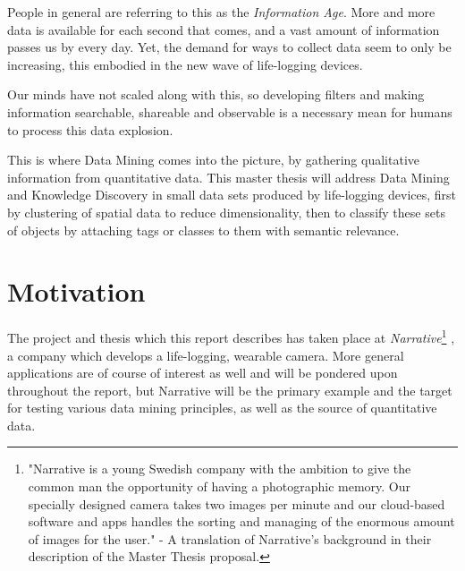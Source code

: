 
People in general are referring to this as the \emph{Information Age}. 
More and more data is available for each second that comes, and 
a vast amount of information passes us by every day. Yet, the demand for 
ways to collect data seem to only be increasing, this embodied in the new
wave of life-logging devices.

Our minds have not scaled along with this, so developing 
filters and making information searchable, shareable and observable
is a necessary mean for humans to process this data explosion. 

This is where Data Mining comes into the picture, by gathering qualitative
information from quantitative data. This master thesis will address Data Mining 
and Knowledge Discovery in small data sets produced by life-logging devices, 
first by clustering of spatial data to reduce dimensionality, then to classify 
these sets of objects by attaching tags or classes to them with semantic 
relevance.

\section{Motivation}

The project and thesis which this report describes has taken place 
at \emph{Narrative}\footnote{
    "Narrative is a young Swedish company with the ambition to give the 
    common man the opportunity of having a photographic memory. Our 
    specially designed camera takes two images per minute and our 
    cloud-based software and apps handles the sorting and managing of the 
    enormous amount of images for the user." - A translation of Narrative's 
    background in their description of the Master Thesis proposal. }
, a company which develops a life-logging, wearable camera. More general applications 
are of course of interest as well and will be pondered upon throughout the
report, but Narrative will be the primary example and the target for 
testing various data mining principles, as well as the source of quantitative
data. 


